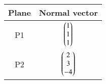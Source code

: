 \begin{tabular}[12pt]{ |c| c|}
    \hline
    \textbf{Plane} & \textbf{Normal vector}\\ 
    \hline
    P1 & $\begin{pmatrix}1\\1\\1\end{pmatrix}$\\
    \hline
    P2 & $\begin{pmatrix}2\\3\\-4\end{pmatrix}$\\
    \hline
    \end{tabular}